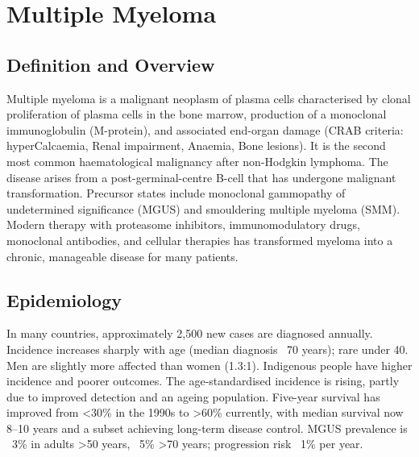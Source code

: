 \chapter{Multiple Myeloma}

\section*{Definition and Overview}
Multiple myeloma is a malignant neoplasm of plasma cells characterised by clonal proliferation of plasma cells in the bone marrow, production of a monoclonal immunoglobulin (M-protein), and associated end-organ damage (CRAB criteria: hyperCalcaemia, Renal impairment, Anaemia, Bone lesions). It is the second most common haematological malignancy after non-Hodgkin lymphoma. The disease arises from a post-germinal-centre B-cell that has undergone malignant transformation. Precursor states include monoclonal gammopathy of undetermined significance (MGUS) and smouldering multiple myeloma (SMM). Modern therapy with proteasome inhibitors, immunomodulatory drugs, monoclonal antibodies, and cellular therapies has transformed myeloma into a chronic, manageable disease for many patients.

\section*{Epidemiology}
In many countries, approximately 2,500 new cases are diagnosed annually. Incidence increases sharply with age (median diagnosis ~70 years); rare under 40. Men are slightly more affected than women (1.3:1). Indigenous people have higher incidence and poorer outcomes. The age-standardised incidence is rising, partly due to improved detection and an ageing population. Five-year survival has improved from <30\% in the 1990s to >60\% currently, with median survival now 8--10 years and a subset achieving long-term disease control. MGUS prevalence is ~3\% in adults >50 years, ~5\% >70 years; progression risk ~1\% per year.

